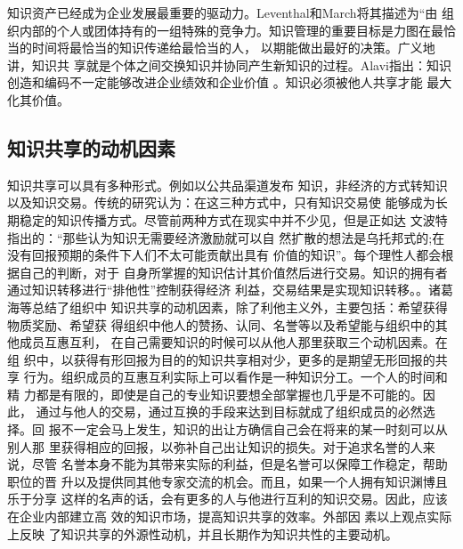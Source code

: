 \documentclass[12pt,a4paper]{ctexart}
\begin{document}
知识资产已经成为企业发展最重要的驱动力。Leventhal和March将其描述为“由
组织内部的个人或团体持有的一组特殊的竞争力\cite{levinthal1993ml}。知识管理的重要目标是力图在最恰当的时间将最恰当的知识传递给最恰当的人，
以期能做出最好的决策\cite{Petrash1996}。广义地讲，知识共
享就是个体之间交换知识并协同产生新知识的过程。Alavi指出：知识创造和编码不一定能够改进企业绩效和企业价值
\cite{alavi2000mok}。知识必须被他人共享才能
最大化其价值。

\subsection{知识共享的动机因素}

知识共享可以具有多种形式。例如以公共品渠道发布
知识，非经济的方式转知识以及知识交易。传统的研究认为：在这三种方式中，只有知识交易使
能够成为长期稳定的知识传播方式。尽管前两种方式在现实中并不少见，但是正如达
文波特指出的：“那些认为知识无需要经济激励就可以自
然扩散的想法是乌托邦式的;在没有回报预期的条件下人们不太可能贡献出具有
价值的知识”\cite{davenport1998wko}。每个理性人都会根据自己的判断，对于
自身所掌握的知识估计其价值然后进行交易。知识的拥有者通过知识转移进行“排他性”控制获得经济
利益，交易结果是实现知识转移。\cite{zhoubo2006}。诸葛海等总结了组织中
知识共享的动机因素，除了利他主义外，主要包括：希望获得物质奖励、希望获
得组织中他人的赞扬、认同、名誉等以及希望能与组织中的其他成员互惠互利，
在自己需要知识的时候可以从他人那里获取三个动机因素\cite{Zhugea}。在组
织中，以获得有形回报为目的的知识共享相对少，更多的是期望无形回报的共享
行为。组织成员的互惠互利实际上可以看作是一种知识分工。一个人的时间和精
力都是有限的，即使是自己的专业知识要想全部掌握也几乎是不可能的。因此，
通过与他人的交易，通过互换的手段来达到目标就成了组织成员的必然选择。回
报不一定会马上发生，知识的出让方确信自己会在将来的某一时刻可以从别人那
里获得相应的回报，以弥补自己出让知识的损失。对于追求名誉的人来说，尽管
名誉本身不能为其带来实际的利益，但是名誉可以保障工作稳定，帮助职位的晋
升以及提供同其他专家交流的机会。而且，如果一个人拥有知识渊博且乐于分享
这样的名声的话，会有更多的人与他进行互利的知识交易。因此，应该在企业内部建立高
效的知识市场，提高知识共享的效率\cite{Andreas2007}。外部因
素以上观点实际上反映
了知识共享的外源性动机，并且长期作为知识共性的主要动机。
\end{document}
